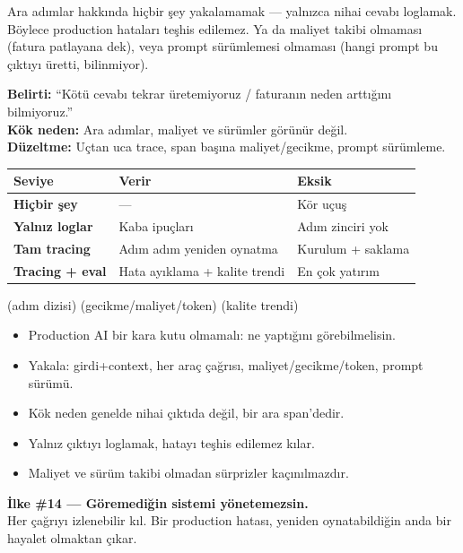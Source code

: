 \begin{antibox}
Ara adımlar hakkında hiçbir şey yakalamamak --- yalnızca nihai cevabı loglamak.
Böylece production hataları teşhis edilemez. Ya da maliyet takibi olmaması
(fatura patlayana dek), veya prompt sürümlemesi olmaması (hangi prompt bu çıktıyı
üretti, bilinmiyor).

\smallskip
\textbf{Belirti:} ``Kötü cevabı tekrar üretemiyoruz / faturanın neden arttığını bilmiyoruz.''\\
\textbf{Kök neden:} Ara adımlar, maliyet ve sürümler görünür değil.\\
\textbf{Düzeltme:} Uçtan uca trace, span başına maliyet/gecikme, prompt sürümleme.
\end{antibox}

\vspace{2pt}
\begin{tabularx}{\linewidth}{@{}>{\raggedright\arraybackslash}p{30mm} L L@{}}
\toprule
{\sffamily\bfseries\small Seviye} & {\sffamily\bfseries\small Verir} & {\sffamily\bfseries\small Eksik} \\
\midrule
\textbf{Hiçbir şey} & --- & Kör uçuş \\
\addlinespace[2pt]
\textbf{Yalnız loglar} & Kaba ipuçları & Adım zinciri yok \\
\addlinespace[2pt]
\textbf{Tam tracing} & Adım adım yeniden oynatma & Kurulum + saklama \\
\addlinespace[2pt]
\textbf{Tracing + eval} & Hata ayıklama + kalite trendi & En çok yatırım \\
\bottomrule
\end{tabularx}

 (adım dizisi) \tlsep {} (gecikme/maliyet/token) \tlsep
{} \tlsep {} \tlsep {} (kalite trendi)

\begin{itemize}
  \item Production AI bir kara kutu olmamalı: ne yaptığını görebilmelisin.
  \item Yakala: girdi+context, her araç çağrısı, maliyet/gecikme/token, prompt sürümü.
  \item Kök neden genelde nihai çıktıda değil, bir ara span'dedir.
  \item Yalnız çıktıyı loglamak, hatayı teşhis edilemez kılar.
  \item Maliyet ve sürüm takibi olmadan sürprizler kaçınılmazdır.
\end{itemize}

\begin{principlebox}
\textbf{İlke \#14 — Göremediğin sistemi yönetemezsin.}\\[4pt]
\normalsize Her çağrıyı izlenebilir kıl. Bir production hatası, yeniden
oynatabildiğin anda bir hayalet olmaktan çıkar.
\end{principlebox}
